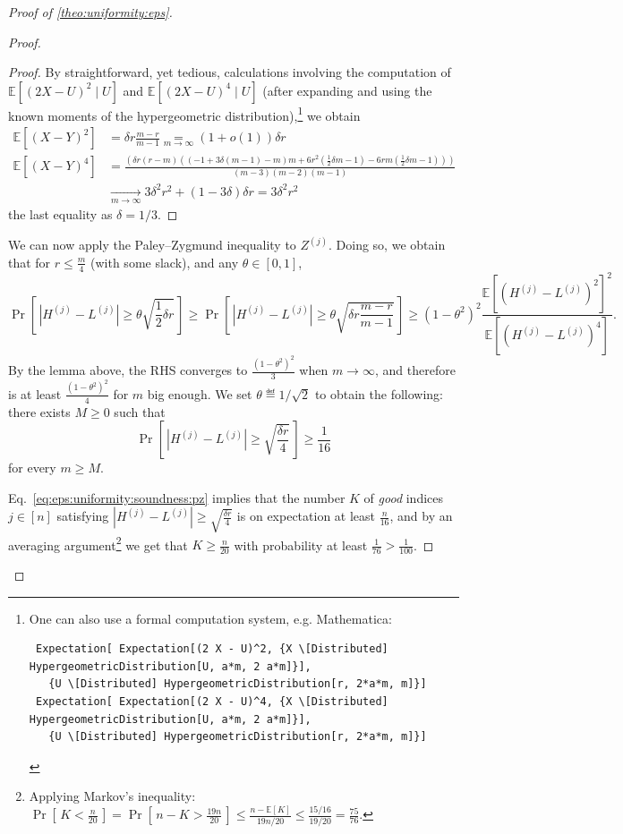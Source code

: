 \documentclass[11pt]{article}
\theoremstyle{remark}   	\newtheorem{remark}[theorem]{Remark}
\theoremstyle{definition}   	\newaliascnt{defn}{theorem}
\newenvironment{proofof}[1]{\begin{proof}[Proof of {#1}]}{\end{proof}}
\newcommand{\proba}{\Pr}
\newcommand{\probaOf}[1]{\proba\!\left[\, #1\, \right]}
\newcommand{\expect}[1]{\mathbb{E}\!\left[#1\right]}
\newcommand{\abs}[1]{\left\lvert #1 \right\rvert}
\begin{document}
\begin{proofof}{\autoref{theo:uniformity:eps}}
\begin{proof}
\begin{proof}
By straightforward, yet tedious, calculations involving the computation of $\expect{(2X-U)^2\mid U }$ and $\expect{(2X-U)^4\mid U }$ (after expanding and using the known moments of the hypergeometric distribution),\footnote{One can also use a formal computation system, e.g. Mathematica:\scriptsize
\begin{verbatim}
 Expectation[ Expectation[(2 X - U)^2, {X \[Distributed] HypergeometricDistribution[U, a*m, 2 a*m]}],
   {U \[Distributed] HypergeometricDistribution[r, 2*a*m, m]}]
 Expectation[ Expectation[(2 X - U)^4, {X \[Distributed] HypergeometricDistribution[U, a*m, 2 a*m]}],
   {U \[Distributed] HypergeometricDistribution[r, 2*a*m, m]}]
\end{verbatim}
}{} we obtain
\begin{align*}
  \expect{(X-Y)^2} &= \delta r \frac{m-r}{m-1} \operatorname*{=}_{m\to\infty} (1+o(1)) \delta r \\
  \expect{(X-Y)^4} &= \frac{(\delta r (r - m) ((-1 + 3\delta (m-1) - m) m + 6 r^2 (\frac{1}{2}\delta m-1) - 6 r m (\frac{1}{2}\delta m-1)))}{(m-3) (m-2) (m-1)} \\
  &\xrightarrow[m\to\infty]{} 3\delta^2 r^2 + (1 - 3\delta) \delta r = 3\delta^2 r^2
\end{align*}
the last equality as $\delta=1/3$.
  \end{proof}
  We can now apply the Paley--Zygmund inequality to $Z^{(j)}$. Doing so, we obtain that for $r \leq \frac{m}{4}$ (with some slack), and any $\theta\in[0,1]$,
  \[
      \probaOf{ \abs{H^{(j)} - L^{(j)}} \geq \theta \sqrt{\frac{1}{2}\delta r} } 
      \geq
      \probaOf{ \abs{H^{(j)} - L^{(j)}} \geq \theta \sqrt{\delta r \frac{m-r}{m-1}} } \geq (1-\theta^2)^2\frac{\expect{(H^{(j)} - L^{(j)})^2}^2}{\expect{(H^{(j)} - L^{(j)})^4}}.
  \]
  By the lemma above, the RHS converges to $\frac{(1-\theta^2)^2}{3}$ when $m\to \infty$, and therefore is at least $\frac{(1-\theta^2)^2}{4}$ for $m$ big enough. We set $\theta \eqdef 1/\sqrt{2}$ to obtain the following: there exists $M\geq 0$ such that
  \begin{equation}\label{eq:eps:uniformity:soundness:pz}
    \probaOf{ \abs{H^{(j)} - L^{(j)}} \geq \sqrt{\frac{\delta r}{4}} } \geq \frac{1}{16}
  \end{equation}
  for every $m\geq M$.
  
  Eq.~\eqref{eq:eps:uniformity:soundness:pz} implies that the number $K$ of \emph{good} indices $j\in[n]$ satisfying $\abs{H^{(j)} - L^{(j)}} \geq \sqrt{\frac{\delta r}{4}}$ is on expectation at least $\frac{n}{16}$, and by an averaging argument\footnote{Applying Markov's inequality: $\probaOf{K < \frac{n}{20}} = \probaOf{n-K > \frac{19n}{20}} \leq \frac{n-\expect{K}}{19n/20} \leq  \frac{15/16}{19/20} = \frac{75}{76}$.}  we get that $K\geq \frac{n}{20}$ with probability at least $\frac{1}{76} > \frac{1}{100}$.
  

\end{proof}
\end{proofof}
\end{document}
